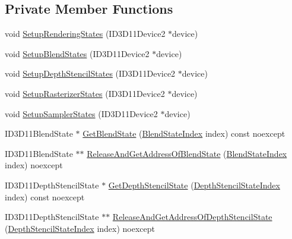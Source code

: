 \subsection*{Private Member Functions}
\begin{DoxyCompactItemize}
\item 
void \hyperlink{structmage_1_1_rendering_state_cache_a5f1d08b50508baddaa365395d8f6d409}{Setup\+Rendering\+States} (I\+D3\+D11\+Device2 $\ast$device)
\item 
void \hyperlink{structmage_1_1_rendering_state_cache_a62b31448f7ffede34ec0d90740463719}{Setup\+Blend\+States} (I\+D3\+D11\+Device2 $\ast$device)
\item 
void \hyperlink{structmage_1_1_rendering_state_cache_aa96d3e317414c7589a2886b505284dd0}{Setup\+Depth\+Stencil\+States} (I\+D3\+D11\+Device2 $\ast$device)
\item 
void \hyperlink{structmage_1_1_rendering_state_cache_aa1b8007465809eba4a8bc30f8a4527bb}{Setup\+Rasterizer\+States} (I\+D3\+D11\+Device2 $\ast$device)
\item 
void \hyperlink{structmage_1_1_rendering_state_cache_a9d34b3b8b46cc4cd764d1bdd6ebddf23}{Setup\+Sampler\+States} (I\+D3\+D11\+Device2 $\ast$device)
\item 
I\+D3\+D11\+Blend\+State $\ast$ \hyperlink{structmage_1_1_rendering_state_cache_ab88f3e29706626a6a33c49c6bc7d8d33}{Get\+Blend\+State} (\hyperlink{structmage_1_1_rendering_state_cache_af1d994cc6a3134ded0b24353de5686d0}{Blend\+State\+Index} index) const noexcept
\item 
I\+D3\+D11\+Blend\+State $\ast$$\ast$ \hyperlink{structmage_1_1_rendering_state_cache_a60dc79d7d5c0bf28ba47c1ddca593417}{Release\+And\+Get\+Address\+Of\+Blend\+State} (\hyperlink{structmage_1_1_rendering_state_cache_af1d994cc6a3134ded0b24353de5686d0}{Blend\+State\+Index} index) noexcept
\item 
I\+D3\+D11\+Depth\+Stencil\+State $\ast$ \hyperlink{structmage_1_1_rendering_state_cache_a85f93628c23e3faf816acaf874fdd9b6}{Get\+Depth\+Stencil\+State} (\hyperlink{structmage_1_1_rendering_state_cache_af6e27c63442c684390b23b6a85020f15}{Depth\+Stencil\+State\+Index} index) const noexcept
\item 
I\+D3\+D11\+Depth\+Stencil\+State $\ast$$\ast$ \hyperlink{structmage_1_1_rendering_state_cache_abc4a1c72c5540a6124cbc674daa6114b}{Release\+And\+Get\+Address\+Of\+Depth\+Stencil\+State} (\hyperlink{structmage_1_1_rendering_state_cache_af6e27c63442c684390b23b6a85020f15}{Depth\+Stencil\+State\+Index} index) noexcept
\item 

\end{DoxyCompactItemize}
